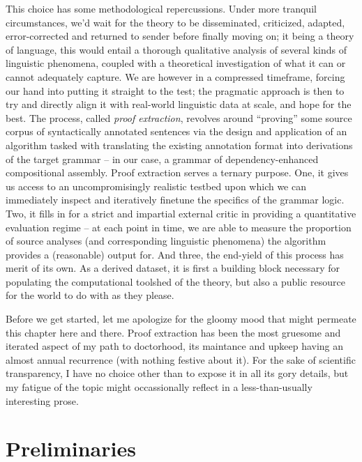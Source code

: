This choice has some methodological repercussions.
Under more tranquil circumstances, we'd wait for the theory to be disseminated, criticized, adapted, error-corrected and returned to sender before finally moving on; it being a theory of language, this would entail a thorough qualitative analysis of several kinds of linguistic phenomena, coupled with a theoretical investigation of what it can or cannot adequately capture.
We are however in a compressed timeframe, forcing our hand into putting it straight to the test; the pragmatic approach is then to try and directly align it with real-world linguistic data at scale, and hope for the best.
The process, called \textit{proof extraction}, revolves around ``proving''  some source corpus of syntactically annotated sentences via the design and application of an algorithm tasked with translating the existing annotation format into derivations of the target grammar -- in our case, a grammar of dependency-enhanced compositional assembly.
Proof extraction serves a ternary purpose.
One, it gives us access to an uncompromisingly realistic testbed upon which we can immediately inspect and iteratively finetune the specifics of the grammar logic.
Two, it fills in for a strict and impartial external critic in providing a quantitative evaluation regime -- at each point in time, we are able to measure the proportion of source analyses (and corresponding linguistic phenomena) the algorithm provides a (reasonable) output for.
And three, the end-yield of this process has merit of its own.
As a derived dataset, it is first a building block necessary for populating the computational toolshed of the theory, but also a public resource for the world to do with as they please.

Before we get started, let me apologize for the gloomy mood that might permeate this chapter here and there.
Proof extraction has been the most gruesome and iterated aspect of my path to doctorhood, its maintance and upkeep having an almost annual recurrence (with nothing festive about it).
For the sake of scientific transparency, I have no choice other than to expose it in all its gory details, but my fatigue of the topic might occassionally reflect in a less-than-usually interesting prose.

\section{Preliminaries}
\label{section:preliminaries}

